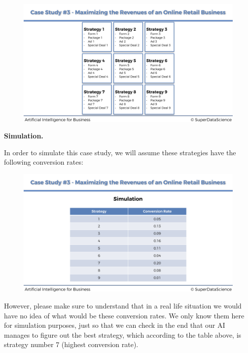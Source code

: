 \documentclass[]{book}
\begin{document}
\begin{figure}[!htbp]
        \begin{center}
            \includegraphics[scale=0.165]{Strategies_Slide.png}
        \end{center}
\end{figure}

\textbf{Simulation.}

In order to simulate this case study, we will assume these strategies have the following conversion rates:

\begin{figure}[!htbp]
        \begin{center}
            \includegraphics[scale=0.165]{Simulation_Slide.png}
        \end{center}
\end{figure}

However, please make sure to understand that in a real life situation we would have no idea of what would be these conversion rates. We only know them here for simulation purposes, just so that we can check in the end that our AI manages to figure out the best strategy, which according to the table above, is strategy number 7 (highest conversion rate).
\end{document}
